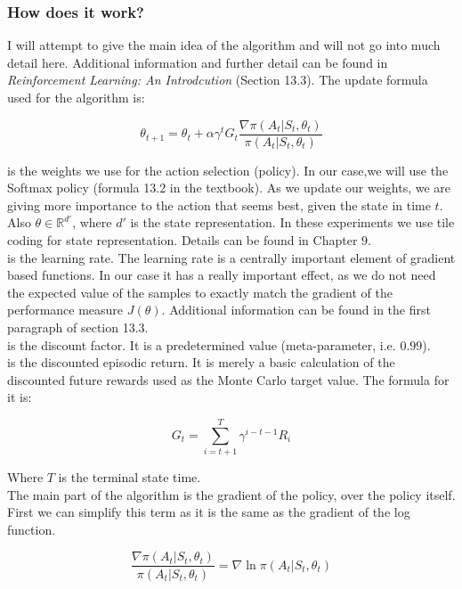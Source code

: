 \documentclass[10pt, letterpaper, twocolumn]{article}
\begin{document}
	\subsubsection{How does it work?}
	I will attempt to give the main idea of the algorithm and will not go into much detail here. Additional information and further detail can be found in \textit{Reinforcement Learning: An Introdcution} (Section 13.3). The update formula used for the algorithm is:
	
	$$\theta_{t+1} = \theta_{t} + \alpha \gamma^t G_t \frac{\nabla \pi(A_t| S_t, \theta_t)}{\pi(A_t| S_t, \theta_t)}$$
	
	\noindent \bm{$\theta$} is the weights we use for the action selection (policy). In our case,we will use the Softmax policy (formula 13.2 in the textbook). As we update our weights, we are giving more importance to the action that seems best, given the state in time $t$. Also $\theta \in \mathbb{R}^{d'}$, where $d'$ is the state representation. In these experiments we use tile coding for state representation. Details can be found in Chapter 9.\\ 
	
	\noindent \bm{$\alpha$} is the learning rate. The learning rate is a centrally important element of gradient based functions. In our case it has a really important effect, as we do not need the expected value of the samples to exactly match the gradient of the performance measure $J(\theta)$. Additional information can be found in the first paragraph of section 13.3.\\
	
	\noindent \bm{$\gamma$} is the discount factor. It is a predetermined value (meta-parameter, i.e. $0.99$).\\
	
	\noindent {} is the discounted episodic return. It is merely a basic calculation of the discounted future rewards used as the Monte Carlo target value. The formula for it is:
	
	$$G_t = \sum_{i=t+1}^{T} \gamma^{i-t-1} R_i$$
	
	Where $T$ is the terminal state time.\\
	
	\noindent The main part of the algorithm is the gradient of the policy, over the policy itself. First we can simplify this term as it is the same as the gradient of the log function.
	
	$$\frac{\nabla \pi(A_t| S_t, \theta_t)}{\pi(A_t| S_t, \theta_t)} = \nabla\ln\pi(A_t|S_t,\theta_t)$$
	
\end{document}
